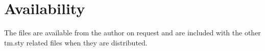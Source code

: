 \section{Availability}
The files are available from the author on request and are included
with the other tm.sty related files when they are distributed.

%
%

